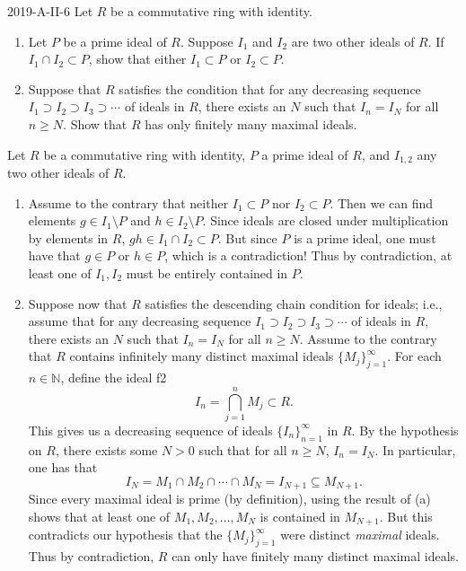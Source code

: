 \documentclass{article}
\begin{document}
	\begin{prb}{2019-A-II-6}
		Let $R$ be a commutative ring with identity. \vspace{-0.25cm}
		\begin{enumerate}[itemsep =-2pt,label = (\alph{*})]
			\item Let $P$ be a prime ideal of $R$. Suppose $I_{1}$ and $I_{2}$ are two other ideals of $R$. If $I_{1} \cap I_{2} \subset P$, show that either $I_{1} \subset P$ or $I_{2} \subset P$. 
			\item Suppose that $R$ satisfies the condition that for any decreasing sequence $I_{1} \supset I_{2} \supset I_{3} \supset \dotsm$ of ideals in $R$, there exists an $N$ such that $I_{n}=   I_{N}$ for all $n\geq N$. Show that $R$ has only finitely many maximal ideals. 
		\end{enumerate}
	\end{prb}
	Let $R$ be a commutative ring with identity, $P$ a prime ideal of $R$, and $I_{1,2}$ any two other ideals of $R$. \vspace{-0.25cm}
	\begin{enumerate}[itemsep =-2pt,label = (\alph{*})]
		\item Assume to the contrary that neither $I_{1} \subset P$ nor $I_{2} \subset P$. Then we can find elements $g \in I_{1} \setminus P$ and $h \in I_2 \setminus P$. Since ideals are closed under multiplication by elements in $R$, $gh \in I_{1} \cap I_{2} \subset P$. But since $P$ is a prime ideal, one must have that $g \in P$ or $h \in P$, which is a contradiction! Thus by contradiction, at least one of $I_{1}, I_{2}$ must be entirely contained in $P$. 
		\item Suppose now that $R$ satisfies the descending chain condition for ideals; i.e., assume that for any decreasing sequence $I_{1} \supset I_{2} \supset I_{3} \supset \dotsm$ of ideals in $R$, there exists an $N$ such that $I_{n}= I_{N}$ for all $n \geq N$. Assume to the contrary that $R$ contains infinitely many distinct maximal ideals $\{M_{j}\}_{j = 1}^{\infty}$. For each $n \in \mathbb{N}$, define the ideal
f2		\begin{equation*}
			I_{n} = \bigcap_{j = 1}^{n}M_{j} \subset R. 
		\end{equation*}
		This gives us a decreasing sequence of ideals $\{I_{n}\}_{n = 1}^{\infty}$ in $R$. By the hypothesis on $R$, there exists some $N > 0$ such that for all $n \geq N$, $I_{n} = I_{N}$. In particular, one has that 
		\begin{equation*}
			I_{N} = M_{1} \cap M_{2} \cap \dotsm \cap M_{N} = I_{N + 1} \subseteq M_{N + 1}. 
		\end{equation*}
		Since every maximal ideal is prime (by definition), using the result of (a) shows that at least one of $M_{1}, M_{2}, \ldots, M_{N}$ is contained in $M_{N + 1}$. But this contradicts our hypothesis that the $\{M_{j}\}_{j = 1}^{\infty}$ were distinct \textit{maximal} ideals. Thus by contradiction, $R$ can only have finitely many distinct maximal ideals. 
	\end{enumerate}
	
\end{document}

